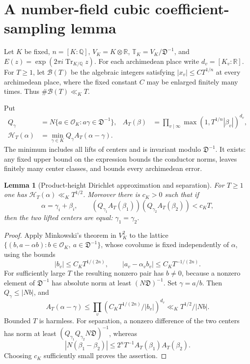 \documentclass[11pt,reqno]{amsart}
\numberwithin{equation}{section}
\newtheorem{lemma}[theorem]{Lemma}
\theoremstyle{definition}
\begin{document}
\section{A number-field cubic coefficient-sampling lemma}
\label{sec:coefficient-sampling-common}

Let $K$ be fixed, $n=[K:\mathbb Q]$, $V_K=K\otimes\mathbb R$,
$\mathbb T_K=V_K/\mathfrak D^{-1}$, and
$E(z)=\exp(2\pi i\operatorname{Tr}_{K/\mathbb Q}z)$.
For each archimedean place write $d_v=[K_v:\mathbb R]$.
For $T\ge1$, let $\mathcal B(T)$ be the algebraic integers satisfying
$|x_v|\le C T^{1/n}$ at every archimedean place, where the fixed
constant $C$ may be enlarged finitely many times.
Thus $\#\mathcal B(T)\ll_K T$.

Put
\begin{align*}
 Q_\gamma&=N\{a\in\mathcal O_K:a\gamma\in\mathfrak D^{-1}\},
 &A_T(\beta)&=\prod_{v\mid\infty}
              \max(1,T^{1/n}|\beta_v|)^{d_v},\\
 \mathcal H_T(\alpha)&=\min_{\gamma\in K}Q_\gamma A_T(\alpha-\gamma).
\end{align*}
The minimum includes all lifts of centers and is invariant modulo
$\mathfrak D^{-1}$. It exists: any fixed upper bound on the expression
bounds the conductor norms, leaves finitely many center classes, and
bounds every archimedean error.

\begin{lemma}[Product-height Dirichlet approximation and separation]
\label{lem:g789-height}
For $T\ge1$ one has $\mathcal H_T(\alpha)\ll_K T^{1/2}$.
Moreover there is $c_K>0$ such that if
\[
 \alpha=\gamma_i+\beta_i,\qquad
 (Q_{\gamma_1}A_T(\beta_1))
 (Q_{\gamma_2}A_T(\beta_2))<c_KT,
\]
then the two lifted centers are equal: $\gamma_1=\gamma_2$.
\end{lemma}
\begin{proof}
Apply Minkowski's theorem in $V_K^2$ to the lattice
$\{(b,a-\alpha b):b\in\mathcal O_K,\ a\in\mathfrak D^{-1}\}$,
whose covolume is fixed independently of $\alpha$, using the bounds
\[
 |b_v|\le C_KT^{1/(2n)},\qquad
 |a_v-\alpha_vb_v|\le C_KT^{-1/(2n)}.
\]
For sufficiently large $T$ the resulting nonzero pair has $b\ne0$,
because a nonzero element of $\mathfrak D^{-1}$ has absolute norm
at least $(N\mathfrak D)^{-1}$. Set $\gamma=a/b$.
Then $Q_\gamma\le|Nb|$, and
\[
 A_T(\alpha-\gamma)
 \le \prod_v(C_KT^{1/(2n)}/|b_v|)^{d_v}
 \ll_K T^{1/2}/|Nb|.
\]
Bounded $T$ is harmless. For separation, a nonzero difference of the
two centers has norm at least
$(Q_{\gamma_1}Q_{\gamma_2}N\mathfrak D)^{-1}$, whereas
\[
 |N(\beta_1-\beta_2)|\le2^nT^{-1}A_T(\beta_1)A_T(\beta_2).
\]
Choosing $c_K$ sufficiently small proves the assertion.
\end{proof}
\end{document}
